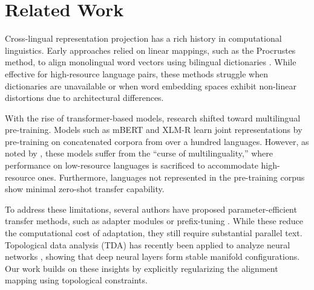 \section{Related Work}
Cross-lingual representation projection has a rich history in computational linguistics. Early approaches relied on linear mappings, such as the Procrustes method, to align monolingual word vectors using bilingual dictionaries \citep{zhang2025crosslingual}. While effective for high-resource language pairs, these methods struggle when dictionaries are unavailable or when word embedding spaces exhibit non-linear distortions due to architectural differences.

With the rise of transformer-based models, research shifted toward multilingual pre-training. Models such as mBERT and XLM-R learn joint representations by pre-training on concatenated corpora from over a hundred languages. However, as noted by \citet{pendelton2024nimbus}, these models suffer from the ``curse of multilinguality,'' where performance on low-resource languages is sacrificed to accommodate high-resource ones. Furthermore, languages not represented in the pre-training corpus show minimal zero-shot transfer capability.

To address these limitations, several authors have proposed parameter-efficient transfer methods, such as adapter modules or prefix-tuning \citep{vance2023synaptic}. While these reduce the computational cost of adaptation, they still require substantial parallel text. Topological data analysis (TDA) has recently been applied to analyze neural networks \citep{rostova2025topological}, showing that deep neural layers form stable manifold configurations. Our work builds on these insights by explicitly regularizing the alignment mapping using topological constraints.
